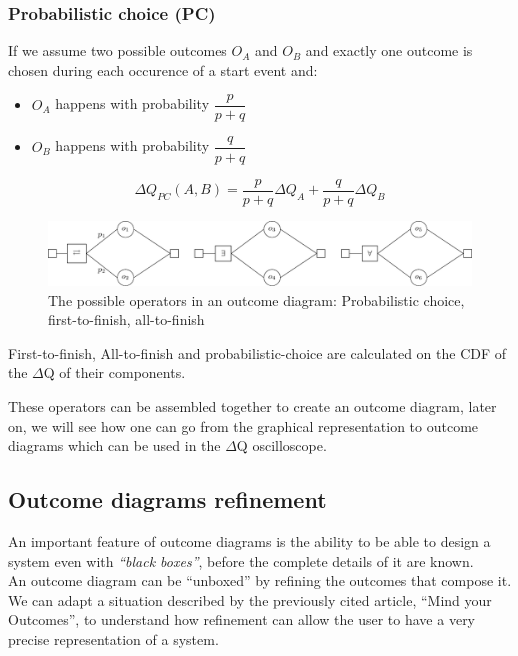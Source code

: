     \subsubsection{Probabilistic choice (PC)}
        If we assume two possible outcomes $O_A$ and $O_B$ and exactly one outcome is chosen during each occurence of a start event and:
        \begin{itemize}
            \item $O_A$ happens with probability $\dfrac{p}{p+q}$
            \item $O_B$ happens with probability $\dfrac{q}{p + q}$
        \end{itemize}
        \begin{equation}
           \Delta Q_{PC}(A, B) = \dfrac{p}{p + q}\Delta Q_A + \dfrac{q}{p + q}\Delta Q_B 
            \label{eq:pc}
        \end{equation} 

    \begin{figure}[H]
        \begin{center}
            \includegraphics[width = \textwidth]{tikz/op.pdf}
        \end{center}
        \caption{The possible operators in an outcome diagram: Probabilistic choice, first-to-finish, all-to-finish}
        \label{fig:op}
    \end{figure}
    First-to-finish, All-to-finish and probabilistic-choice are calculated on the CDF of the $\Delta$Q of their components.
    
    These operators can be assembled together to create an outcome diagram, later on, we will see how one can go from the graphical representation to outcome diagrams which can be used in the $\Delta$Q oscilloscope.
    
    \subsection{Outcome diagrams refinement}
        An important feature of outcome diagrams is the ability to be able to design a system even with \textit{``black boxes''}, before the complete details of it are known. \cite{myo} \\
        An outcome diagram can be ``unboxed'' by refining the outcomes that compose it. We can adapt a situation described by the previously cited article, ``Mind your Outcomes'', to understand how refinement can allow the user to have a very precise representation of a system. 
        
